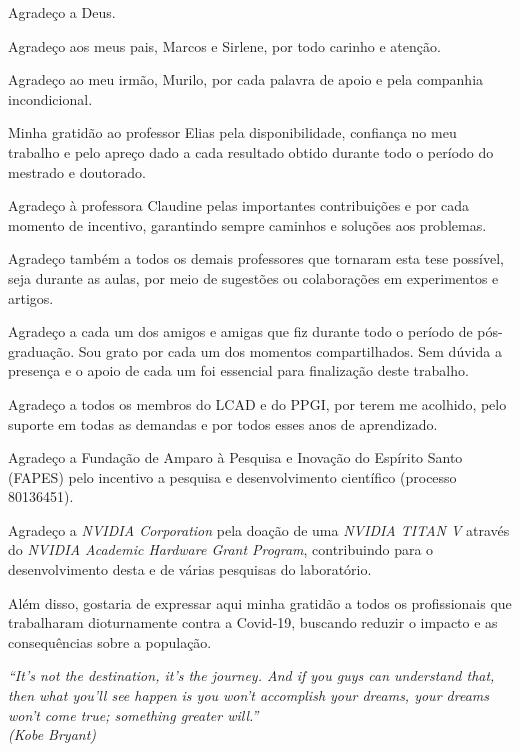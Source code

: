 \documentclass[
	12pt,				%
	openright,			%
	twoside,			%
	a4paper,			%
	english,			%
	french,				%
	spanish,			%
	brazil				%
	]{abntex2}
\begin{document}
\begin{agradecimentos}
Agradeço a Deus.

Agradeço aos meus pais, Marcos e Sirlene, por todo carinho e atenção.

Agradeço ao meu irmão, Murilo, por cada palavra de apoio e pela companhia incondicional.

Minha gratidão ao professor Elias pela disponibilidade, confiança no meu trabalho e pelo apreço dado a cada resultado obtido durante todo o período do mestrado e doutorado.

Agradeço à professora Claudine pelas importantes contribuições e por cada momento de incentivo, garantindo sempre caminhos e soluções aos problemas.

Agradeço também a todos os demais professores que tornaram esta tese possível, seja durante as aulas, por meio de sugestões ou colaborações em experimentos e artigos.

Agradeço a cada um dos amigos e amigas que fiz durante todo o período de pós-graduação. Sou grato por cada um dos momentos compartilhados. Sem dúvida a presença e o apoio de cada um foi essencial para finalização deste trabalho.

Agradeço a todos os membros do LCAD e do PPGI, por terem me acolhido, pelo suporte em todas as demandas e por todos esses anos de aprendizado.

Agradeço a Fundação de Amparo à Pesquisa e Inovação do Espírito Santo (FAPES) pelo incentivo a pesquisa e desenvolvimento científico (processo 80136451).

Agradeço a \textit{NVIDIA Corporation} pela doação de uma \textit{NVIDIA TITAN V} através do \textit{NVIDIA Academic Hardware Grant Program}, contribuindo para o desenvolvimento desta e de várias pesquisas do laboratório.

Além disso, gostaria de expressar aqui minha gratidão a todos os profissionais que trabalharam dioturnamente contra a Covid-19, buscando reduzir o impacto e as consequências sobre a população.

\end{agradecimentos}


\begin{epigrafe}
    \vspace*{\fill}
	\begin{flushright}
		\textit{``It’s not the destination, it’s the journey. And if you guys can understand that, then what you’ll see happen is you won’t accomplish your dreams, your dreams won’t come true; something greater will.''\\
		(Kobe Bryant)}
	\end{flushright}
\end{epigrafe}
\end{document}
